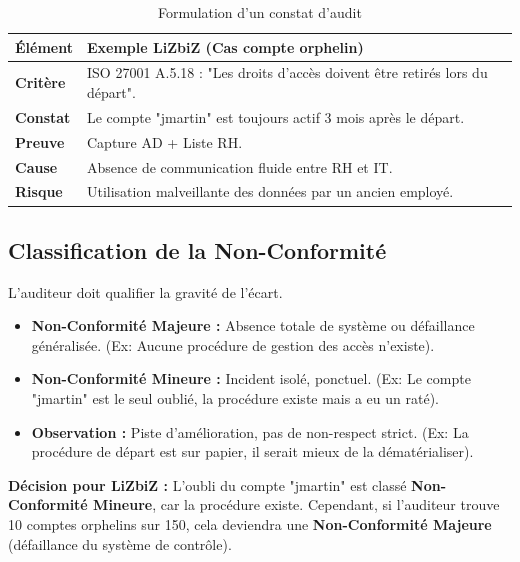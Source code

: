 \begin{table}[htbp]
\centering
\small
\begin{tabular}{p{3cm}p{9cm}}
    \toprule
    \textbf{Élément} & \textbf{Exemple LiZbiZ (Cas compte orphelin)} \\
    \midrule
    \textbf{Critère} & ISO 27001 A.5.18 : "Les droits d'accès doivent être retirés lors du départ". \\
    \textbf{Constat} & Le compte "jmartin" est toujours actif 3 mois après le départ. \\
    \textbf{Preuve} & Capture AD + Liste RH. \\
    \textbf{Cause} & Absence de communication fluide entre RH et IT. \\
    \textbf{Risque} & Utilisation malveillante des données par un ancien employé. \\
    \bottomrule
\end{tabular}
\caption{Formulation d'un constat d'audit}
\end{table}

\subsection{Classification de la Non-Conformité}

L'auditeur doit qualifier la gravité de l'écart.

\begin{itemize}
    \item \textbf{Non-Conformité Majeure :} Absence totale de système ou défaillance généralisée. (Ex: Aucune procédure de gestion des accès n'existe).
    \item \textbf{Non-Conformité Mineure :} Incident isolé, ponctuel. (Ex: Le compte "jmartin" est le seul oublié, la procédure existe mais a eu un raté).
    \item \textbf{Observation :} Piste d'amélioration, pas de non-respect strict. (Ex: La procédure de départ est sur papier, il serait mieux de la dématérialiser).
\end{itemize}

\begin{boxlizbiz}
\textbf{Décision pour LiZbiZ :}
L'oubli du compte "jmartin" est classé \textbf{Non-Conformité Mineure}, car la procédure existe. Cependant, si l'auditeur trouve 10 comptes orphelins sur 150, cela deviendra une \textbf{Non-Conformité Majeure} (défaillance du système de contrôle).
\end{boxlizbiz}

